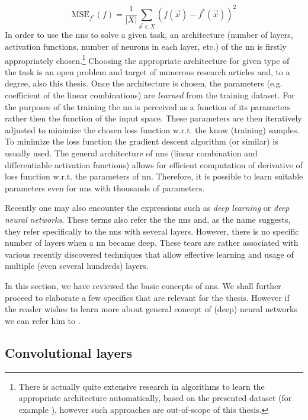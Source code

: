 $$\text{MSE}_{f^*}(f) = \frac{1}{|X|} \sum_{\vec{x} \in X} (f(\vec{x}) - f^*(\vec{x}))^2$$
In order to use the \glspl{nn} to solve a given task, an architecture (number
of layers, activation functions, number of neurons in each layer, etc.) of the
\gls{nn} is firstly appropriately chosen.\footnote{There is actually quite
extensive research in algorithms to learn the appropriate architecture
automatically, based on the presented dataset (for example \cite{neat}),
however such approaches are out-of-scope of this thesis.} Choosing the
appropriate architecture for given type of the task is an open problem and
target of numerous research articles and, to a degree, also this thesis. Once
the architecture is chosen, the parameters (e.g. coefficient of the linear
combinations) are \emph{learned} from the training dataset. For the purposes
of the training the \gls{nn} is perceived as a function of its parameters
rather then the function of the input space. These parameters are then
iteratively adjusted to minimize the chosen loss function w.r.t. the know
(training) samples. To minimize the loss function the gradient descent
algorithm (or similar) is usually used. The general architecture of \glspl{nn}
(linear combination and differentiable activation functions) allows for
efficient computation of derivative of loss function w.r.t. the parameters of
\gls{nn}. Therefore, it is possible to learn suitable parameters even for
\glspl{nn} with thousands of parameters.

Recently one may also encounter the expressions such as \emph{deep learning}
or \emph{deep neural networks}. These terms also refer the the \glspl{nn} and,
as the name suggests, they refer specifically to the \glspl{nn} with several
layers. However, there is no specific number of layers when a \gls{nn} became
deep. These tears are rather associated with various recently discovered
techniques that allow effective learning and usage of multiple (even several
hundreds) layers.

In this section, we have reviewed the basic concepts of \glspl{nn}. We shall
further proceed to elaborate a few specifics that are relevant for the thesis.
However if the reader wishes to learn more about general concept of (deep)
neural networks we can refer him to \cite{deeplearningbook}.

\subsection{Convolutional layers}
\label{sec:conv}

